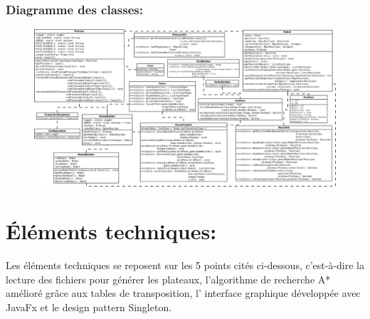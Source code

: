\documentclass[12pt, a4paper, openany]{article}
\begin{document}
\subsubsection{Diagramme des classes: }
\begin{figure}[h]
\begin{center}
\includegraphics[scale=0.23]{DiagrammeDesClasses.png}
\end{center}
\end{figure}


\section{Éléments techniques:}
Les éléments techniques se reposent sur les 5 points cités ci-dessous, c'est-à-dire la lecture des fichiers pour générer les plateaux, l'algorithme de recherche A* amélioré grâce aux tables de transposition, l' interface graphique développée avec JavaFx et le design pattern Singleton.
\end{document}

